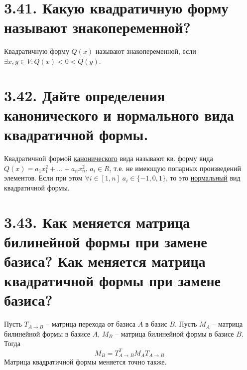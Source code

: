 \documentclass{article}
\begin{document}
\section*{\LARGE 3.41. Какую квадратичную форму называют знакопеременной?}
Квадратичную форму $Q(x)$ называют знакопеременной, если 
\newline $\exists x,y \in V : Q(x) < 0 < Q(y)$.

\section*{\LARGE 3.42. Дайте определения канонического и нормального вида квадратичной формы.}
Квадратичной формой \underline{канонического} вида называют кв. форму вида 
\newline $Q(x) = a_1x_1^2 + ... + a_nx_n^2,\, a_i \in R$, т.е. не имеющую попарных произведений элементов. Если при этом $\forall i \in [1, n] \; a_i \in \{-1, 0, 1\}$, то это \underline{нормальный} вид квадратичной формы.

\section*{\LARGE 3.43. Как меняется матрица билинейной формы при замене базиса? Как меняется матрица квадратичной формы при замене базиса?}
Пусть $T_{A \rightarrow B}$ -- матрица перехода от базиса $A$ в базис $B$. Пусть $M_A$ -- матрица билинейной формы в базисе $A$, $M_B$ -- матрица билинейной формы в базисе $B$. Тогда 
$$
M_B = T_{A \rightarrow B}^T M_A T_{A \rightarrow B}
$$
Матрица квадратичной формы меняется точно также.

\end{document}
